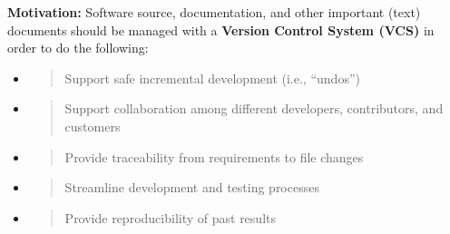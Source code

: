 \documentclass[]{article}
\date{}
\begin{document}
\pagestyle{fancy}
\renewcommand{\headrulewidth}{0pt}
  
\thispagestyle{empty}
\textbf{\newline}
\textbf{\newline}
\textbf{\newline}

\textbf{Motivation:} Software source, documentation, and other important
(text) documents should be managed with a \textbf{Version Control System
(VCS)} in order to do the following:

\begin{itemize}
\item
  \begin{quote}
  Support safe incremental development (i.e., ``undos'')
  \end{quote}
\item
  \begin{quote}
  Support collaboration among different developers, contributors, and
  customers
  \end{quote}
\item
  \begin{quote}
  Provide traceability from requirements to file changes
  \end{quote}
\item
  \begin{quote}
  Streamline development and testing processes
  \end{quote}
\item
  \begin{quote}
  Provide reproducibility of past results
  \end{quote}
\end{itemize}
\end{document}
